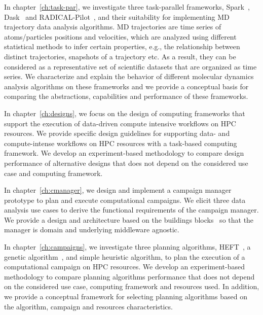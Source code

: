 In chapter~\ref{ch:task-par}, we investigate three task-parallel frameworks,
Spark~\cite{zaharia2010spark}, Dask~\cite{rocklin2015dask} and
RADICAL-Pilot~\cite{merzky2019using}, and their suitability for implementing
MD trajectory data analysis algorithms. MD trajectories are time series of
atoms/particles positions and velocities, which are analyzed using different
statistical methods to infer certain properties, e.g., the relationship
between distinct trajectories, snapshots of a trajectory etc. As a result,
they can be considered as a representative set of scientific datasets that are
organized as time series. We characterize and explain the behavior of
different molecular dynamics analysis algorithms on these frameworks and we
provide a conceptual basis for comparing the abstractions, capabilities and
performance of these frameworks.

In chapter~\ref{ch:designs}, we focus on the design of computing frameworks
that support the execution of data-driven compute intensive workflows on HPC
resources. We provide specific design guidelines for supporting data- and
compute-intense workflows on HPC resources with a task-based computing
framework. We develop an experiment-based methodology to compare design
performance of alternative designs that does not depend on the considered use
case and computing framework.

In chapter~\ref{ch:cmanager}, we design and implement a campaign manager
prototype to plan and execute computational campaigns. We elicit three data
analysis use cases to derive the functional requirements of the campaign
manager. We provide a design and architecture based on the buildings
blocks~\cite{turilli2019middleware} so that the manager is domain and
underlying middleware agnostic.

In chapter~\ref{ch:campaigns}, we investigate three planning algorithms,
HEFT~\cite{topcuoglu2002performance}, a genetic
algorithm~\cite{page2005algorithm}, and simple heuristic algorithm, to plan
the execution of a computational campaign on HPC resources. We develop an
experiment-based methodology to compare planning algorithms performance that
does not depend on the considered use case, computing framework and resources
used. In addition, we provide a conceptual framework for selecting planning
algorithms based on the algorithm, campaign and resources characteristics.

